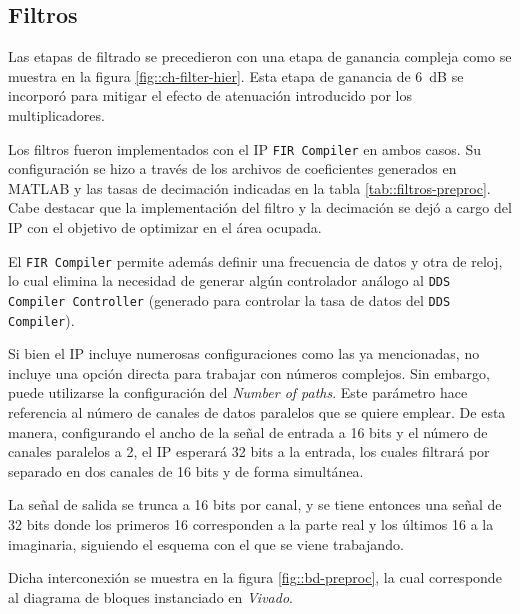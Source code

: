 \documentclass[../../main.tex]{subfiles}
\begin{document}
\subsection{Filtros}
Las etapas de filtrado se precedieron con una etapa de ganancia compleja como se muestra en la figura \ref{fig::ch-filter-hier}. Esta etapa de ganancia de 6~dB se incorporó para mitigar el efecto de atenuación introducido por los multiplicadores.

Los filtros fueron implementados con el IP \texttt{FIR Compiler} en ambos casos. Su configuración se hizo a través de los archivos de coeficientes generados en MATLAB y las tasas de decimación indicadas en la tabla \ref{tab::filtros-preproc}. Cabe destacar que la implementación del filtro y la decimación se dejó a cargo del IP con el objetivo de optimizar en el área ocupada.

El \texttt{FIR Compiler} permite además definir una frecuencia de datos y otra de reloj, lo cual elimina la necesidad de generar algún controlador análogo al \texttt{DDS Compiler Controller} (generado para controlar la tasa de datos del \texttt{DDS Compiler}).

Si bien el IP incluye numerosas configuraciones como las ya mencionadas, no incluye una opción directa para trabajar con números complejos. Sin embargo, puede utilizarse la configuración del \textit{Number of paths}. Este parámetro hace referencia al número de canales de datos paralelos que se quiere emplear. De esta manera, configurando el ancho de la señal de entrada a 16 bits y el número de canales paralelos a 2, el IP esperará 32 bits a la entrada, los cuales filtrará por separado en dos canales de 16 bits y de forma simultánea.

La señal de salida se trunca a 16 bits por canal, y se tiene entonces una señal de 32 bits donde los primeros 16 corresponden a la parte real y los últimos 16 a la imaginaria, siguiendo el esquema con el que se viene trabajando.

Dicha interconexión se muestra en la figura \ref{fig::bd-preproc}, la cual corresponde al diagrama de bloques instanciado en \textit{Vivado}. 

\end{document}
